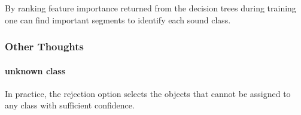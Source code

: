 By ranking feature importance returned from the decision trees during training one can find
important segments to identify each sound class. 




\subsubsection{Other Thoughts}

\paragraph{unknown class}

In practice, the rejection option selects the objects that cannot be assigned to any class with sufficient confidence.

